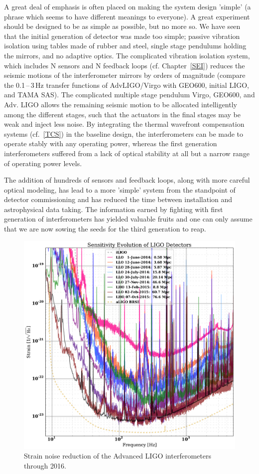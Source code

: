 A great deal of emphasis is often placed on making the system design 'simple'
(a phrase which seems to have different meanings to everyone). A great
experiment should be designed to be as simple as possible, but no more so. We have
seen that the initial generation of detector was made too simple; passive vibration
isolation using tables made of rubber and steel, single stage pendulums holding
the mirrors, and no adaptive optics. The complicated vibration isolation system,
which includes N sensors and N feedback loops (cf. Chapter~\ref{SEI})
reduces the seismic motions of the interferometer mirrors by
orders of magnitude (compare the 0.1\,--\,3\,Hz transfer functions of AdvLIGO/Virgo with GEO600, initial LIGO, and TAMA SAS). The
complicated multiple stage pendulum Virgo, GEO600, and Adv. LIGO
allows the remaining seismic motion to be allocated intelligently
among the different stages, such that the actuators in the final stages
may be weak and inject less noise. By integrating the thermal wavefront
compensation systems (cf.~\ref{TCS}) in the baseline design, the
interferometers can be made to operate stably with any operating power,
whereas the first generation interferometers suffered from a lack of optical stability at all but a narrow range of operating power levels.

The addition of hundreds of sensors and feedback loops, along with more careful
optical modeling, has lead to a more 'simple' system from the standpoint of
detector commissioning and has reduced the time between installation and astrophysical data taking. The information earned by fighting with first generation of interferometers has yielded valuable fruits and one can only assume that we are now sowing the seeds for the third generation to reap.

\begin{figure}[h]
\centering
\includegraphics[width=\columnwidth]{Figures/aLIGO_noises.pdf}
\caption{Strain noise reduction of the Advanced LIGO interferometers
  through 2016.  }
\label{fig:IDC:aLIGOnoises}
\end{figure}


